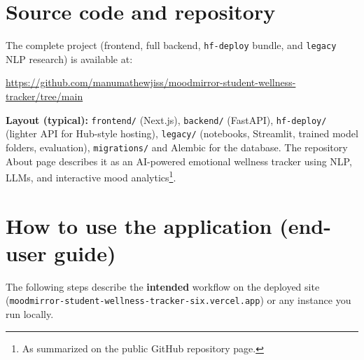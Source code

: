 \documentclass[11pt,a4paper]{article}
\begin{document}
\section{Source code and repository}
\label{sec:github}

The complete project (frontend, full backend, \texttt{hf-deploy} bundle, and \texttt{legacy} NLP research) is available at:

\begin{SourceBox}
\centering\url{https://github.com/manumathewjiss/moodmirror-student-wellness-tracker/tree/main}
\end{SourceBox}

\noindent
\textbf{Layout (typical):} \texttt{frontend/} (Next.js), \texttt{backend/} (FastAPI), \texttt{hf-deploy/} (lighter API for Hub-style hosting), \texttt{legacy/} (notebooks, Streamlit, trained model folders, evaluation), \texttt{migrations/} and Alembic for the database. The repository About page describes it as an AI-powered emotional wellness tracker using NLP, LLMs, and interactive mood analytics\footnote{As summarized on the public GitHub repository page.}.

\section{How to use the application (end-user guide)}
\label{sec:userguide}

The following steps describe the \textbf{intended} workflow on the deployed site (\texttt{moodmirror-student-wellness-tracker-six.vercel.app}) or any instance you run locally.
\end{document}
